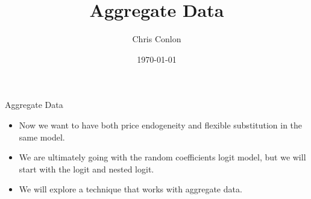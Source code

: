 \def\beamerclassoptions{[dvipsnames,table,mathserif,aspectratio=169]}


\usepackage[english]{babel}
\usepackage{pgf,pgfarrows,pgfnodes,pgfautomata,pgfheaps}
\usepackage{amsmath,amssymb,setspace,centernot}
\usepackage[latin1]{inputenc}
\usepackage[T1]{fontenc}
\usepackage{relsize}
\usepackage{pdfpages}
\usepackage[absolute,overlay]{textpos} 

\newenvironment{reference}[2]{%
  \begin{textblock*}{\textwidth}(#1,#2) 
      \footnotesize\it\bgroup\color{red!50!black}}{\egroup\end{textblock*}} 




\newcommand{\norm}[1]{\left\lVert#1\right\rVert}
\newcommand{\X}{\mathtt{X}}
\newcommand{\Y}{\mathtt{Y}}

\newcommand{\p}{\mathbb{P}}
\newcommand*\df{\mathop{}\!\mathrm{d}}
\newcommand{\del}{\partial}


\title{Aggregate Data}
\author{Chris Conlon}
\date{\today}

\frame{\titlepage}

\begin{frame}{Aggregate Data}
 \begin{itemize}
\item Now we want to have both \alert{price endogeneity} and \alert{flexible substitution} in the same model.
\item We are ultimately going with the random coefficients logit model, but we will start with the logit and nested logit.
\item We will explore a technique that works with \alert{aggregate data}.
 \end{itemize}
\end{frame}



